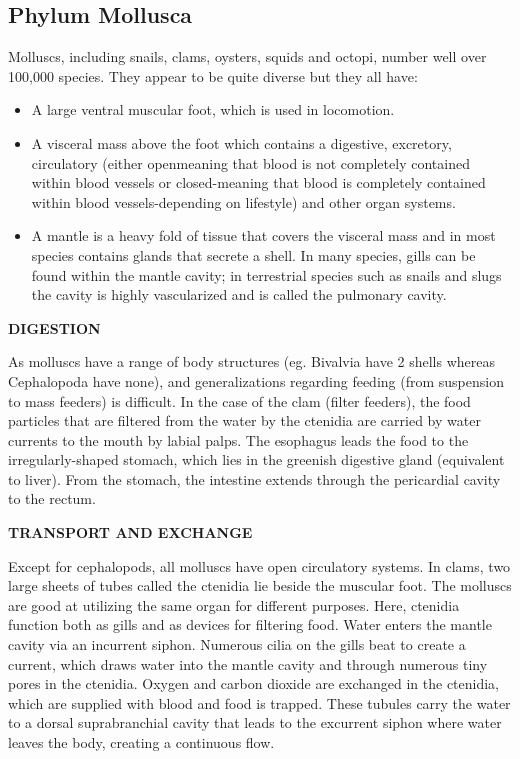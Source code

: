 \documentclass[
]{book}
\providecommand{\tightlist}{%
  \setlength{\itemsep}{0pt}\setlength{\parskip}{0pt}}
\begin{document}
\hypertarget{phylum-mollusca}{%
\subsection*{Phylum Mollusca}\label{phylum-mollusca}}

Molluscs, including snails, clams, oysters, squids and octopi, number well over 100,000 species. They appear to be quite diverse but they all have:

\begin{itemize}
\tightlist
\item
  A large ventral muscular foot, which is used in locomotion.
\item
  A visceral mass above the foot which contains a digestive, excretory, circulatory (either openmeaning that blood is not completely contained within blood vessels or closed-meaning that
  blood is completely contained within blood vessels-depending on lifestyle) and other organ
  systems.
\item
  A mantle is a heavy fold of tissue that covers the visceral mass and in most species contains
  glands that secrete a shell. In many species, gills can be found within the mantle cavity; in
  terrestrial species such as snails and slugs the cavity is highly vascularized and is called the
  pulmonary cavity.
\end{itemize}

\textbf{DIGESTION}

As molluscs have a range of body structures (eg. Bivalvia have 2 shells whereas Cephalopoda have
none), and generalizations regarding feeding (from suspension to mass feeders) is difficult. In the
case of the clam (filter feeders), the food particles that are filtered from the water by the ctenidia
are carried by water currents to the mouth by labial palps. The esophagus leads the food to the irregularly-shaped stomach, which lies in the greenish digestive gland (equivalent to liver). From the stomach, the intestine extends through the pericardial cavity to the rectum.

\textbf{TRANSPORT AND EXCHANGE}

Except for cephalopods, all molluscs have open circulatory systems. In clams, two large sheets
of tubes called the ctenidia lie beside the muscular foot. The molluscs are good at utilizing the same organ for different purposes. Here, ctenidia function both as gills and as devices for filtering food. Water enters the mantle cavity via an incurrent siphon. Numerous cilia on the gills beat to create a current, which draws water into the mantle cavity and through numerous tiny pores in the ctenidia. Oxygen and carbon dioxide are exchanged in the ctenidia, which are supplied with blood and food is trapped. These tubules carry the water to a dorsal suprabranchial cavity that leads to the excurrent siphon where water leaves the body, creating a continuous flow.
\end{document}
